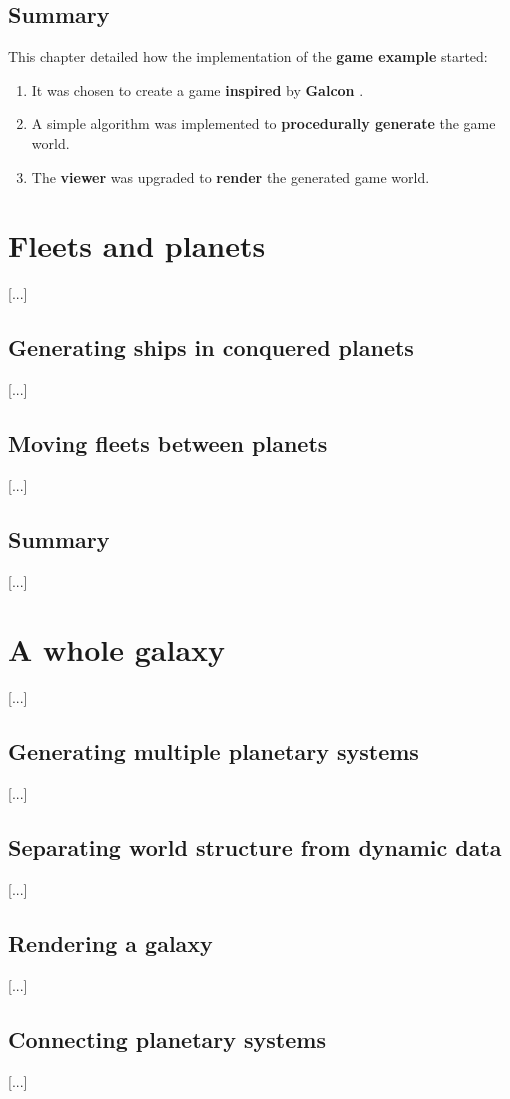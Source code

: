 \documentclass[a4paper,11pt,titlepage,abstract,numbers=noenddot,automark,mnsy,intlimits,rgb,dvipsnames]{report}
\begin{document}
\section{Summary}
This chapter detailed how the implementation of the \textbf{game example} started:
\begin{enumerate}
\item
It was chosen to create a game \textbf{inspired} by \textbf{Galcon} \cite{galcon}.
\item
A simple algorithm was implemented to \textbf{procedurally generate} the game world.
\item
The \textbf{viewer} was upgraded to \textbf{render} the generated game world.
\end{enumerate}
\chapter{Fleets and planets}
[...]
\section{Generating ships in conquered planets}
[...]
\section{Moving fleets between planets}
[...]
\section{Summary}
[...]
\chapter{A whole galaxy}
\label{whole_galaxy}
[...]
\section{Generating multiple planetary systems}
[...]
\section{Separating world structure from dynamic data}
[...]
\section{Rendering a galaxy}
[...]
\section{Connecting planetary systems}
[...]
\end{document}
